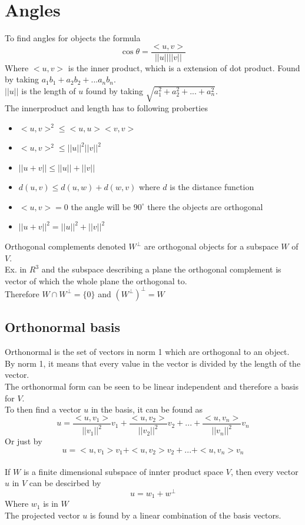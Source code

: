 \documentclass[12pt, a4paper]{article}
\begin{document}
	\section{Angles}
		To find angles for objects the formula
		$$\cos\theta = \frac{<u,v>}{||u||||v||}$$
		Where $<u,v>$ is the inner product, which is a extension of dot product. Found by taking $a_1b_1+a_2b_2+...a_nb_n$.\\
		$||u||$ is the length of $u$ found by taking $\sqrt{a_1^2+a_2^2+...+a_n^2}$.\\
		The innerproduct and length has to following proberties
		\begin{itemize}
			\item $<u,v>^2\leq <u,u><v,v>$
			\item $<u,v>^2\leq ||u||^2||v||^2$
			\item $||u+v||\leq ||u||+||v||$
			\item $d(u,v)\leq d(u,w)+d(w,v)$ where $d$ is the distance function
			\item $<u,v>=0$ the angle will be $90^\circ$ there the objects are orthogonal
			\item $||u+v||^2=||u||^2+||v||^2$
		\end{itemize}
		Orthogonal complements denoted $W^\perp$ are orthogonal objects for a subspace $W$ of $V$.\\
		Ex. in $R^3$ and the subspace describing a plane the orthogonal complement is vector of which the whole plane the orthogonal to.\\
		Therefore $W\cap W^\perp=\{0\}$ and $(W^\perp)^\perp=W$\\
		\subsection{Orthonormal basis}
			Orthonormal is the set of vectors in norm 1 which are orthogonal to an object.\\
			By norm 1, it means that every value in the vector is divided by the length of the vector.\\
			The orthonormal form can be seen to be linear independent and therefore a basis for $V$.\\
			To then find a vector $u$ in the basis, it can be found as
			$$u=\frac{<u,v_1>}{||v_1||^2}v_1+\frac{<u,v_2>}{||v_2||^2}v_2+...+\frac{<u,v_n>}{||v_n||^2}v_n$$
			Or just by 
			$$u=<u,v_1>v_1+<u,v_2>v_2+...+<u,v_n>v_n$$\\[4mm]
			If $W$ is a finite dimensional subspace of innter product space $V$, then every vector $u$ in $V$ can be descirbed by\\
			$$u=w_1+w^\perp$$
			Where $w_1$ is in $W$\\
			The projected vector $u$ is found by a linear combination of the basis vectors.
\end{document}
